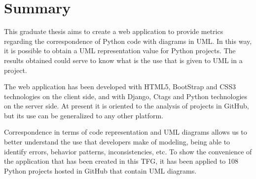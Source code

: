 \documentclass[a4paper, 12pt]{book}
\begin{document}

\chapter*{Summary}

This graduate thesis aims to create a web application to provide metrics regarding the correspondence of Python code with diagrams in UML. In this way, it is possible to obtain a UML representation value for Python projects. The results obtained could serve to know what is the use that is given to UML in a project.

The web application has been developed with HTML5, BootStrap and CSS3 technologies on the client side, and with Django, Ctags and Python technologies on the server side. At present it is oriented to the analysis of projects in GitHub, but its use can be generalized to any other platform.

Correspondence in terms of code representation and UML diagrams allows us to better understand the use that developers make of modeling, being able to identify errors, behavior patterns, inconsistencies, etc. To show the convenience of the application that has been created in this TFG, it has been applied to 108 Python projects hosted in GitHub that contain UML diagrams.




\tableofcontents
\cleardoublepage
\listoffigures %



\end{document}
